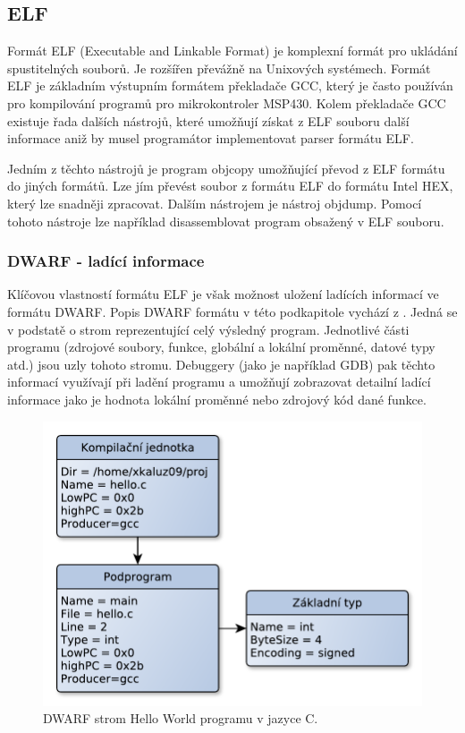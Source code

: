 \subsection{ELF}

Formát ELF (Executable and Linkable Format) je komplexní formát pro ukládání spustitelných souborů. Je rozšířen převážně na Unixových systémech. Formát ELF je základním výstupním formátem překladače GCC, který je často používán pro kompilování programů pro mikrokontroler MSP430. Kolem překladače GCC existuje řada dalších nástrojů, které umožňují získat z ELF souboru další informace aniž by musel programátor implementovat parser formátu ELF. \cite{elf}

Jedním z těchto nástrojů je program objcopy umožňující převod z ELF formátu do jiných formátů. Lze jím převést soubor z formátu ELF do formátu Intel HEX, který lze snadněji zpracovat. Dalším nástrojem je nástroj objdump. Pomocí tohoto nástroje lze například disassemblovat program obsažený v ELF souboru.

\subsubsection{DWARF - ladící informace}

Klíčovou vlastností formátu ELF je však možnost uložení ladících informací ve formátu DWARF. Popis DWARF formátu v této podkapitole vychází z \cite{dwarf}. Jedná se v podstatě o strom reprezentující celý výsledný
program. Jednotlivé části programu (zdrojové soubory, funkce, globální a lokální proměnné, datové typy atd.) jsou uzly tohoto stromu. Debuggery (jako je například GDB) pak těchto informací využívají při ladění programu a umožňují zobrazovat detailní ladící informace jako je hodnota lokální proměnné nebo zdrojový kód dané funkce.

\begin{figure}[ht]
\centering
\includegraphics[trim=0cm 0cm 0cm 0cm, scale=0.7]{fig/dwarf}
\caption{DWARF strom Hello World programu v jazyce C.}
\label{fig:dwarf}
\end{figure}


